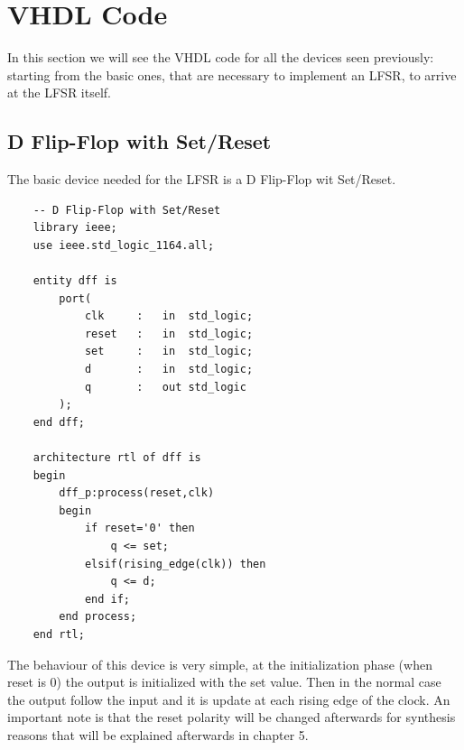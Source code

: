 \documentclass[a4paper]{report}
\begin{document}
\chapter{VHDL Code}
In this section we will see the VHDL code for all the devices seen previously: starting from the basic ones, that are necessary to implement an LFSR, to arrive at the LFSR itself.
\section{D Flip-Flop with Set/Reset}
The basic device needed for the LFSR is a D Flip-Flop wit Set/Reset.
\lstset{ %
	language=VHDL}
\begin{lstlisting}
	-- D Flip-Flop with Set/Reset
	library ieee;
	use ieee.std_logic_1164.all;
	
	entity dff is
		port(
			clk		:	in 	std_logic;
			reset	:	in 	std_logic;
			set 	:	in 	std_logic;
			d 		:	in 	std_logic;
			q 		:	out std_logic
		);
	end dff;
	
	architecture rtl of dff is
	begin
		dff_p:process(reset,clk)
		begin
			if reset='0' then
				q <= set;
			elsif(rising_edge(clk)) then
				q <= d;
			end if;
		end process;
	end rtl;
\end{lstlisting}
The behaviour of this device is very simple, at the initialization phase (when reset is 0) the output is initialized with the set value. Then in the normal case the output follow the input and it is update at each rising edge of the clock.
An important note is that the reset polarity will be changed afterwards for synthesis reasons that will be explained afterwards in chapter 5.
\end{document}
